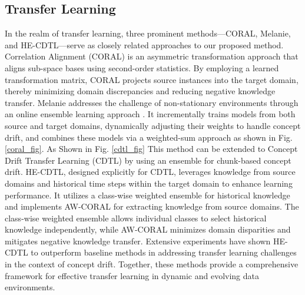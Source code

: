 \subsection{Transfer Learning}
\label{sec:3_6_2_related_work_transfer}

In the realm of transfer learning, three prominent methods—CORAL, Melanie, and HE-CDTL—serve as closely related approaches to our proposed method. Correlation Alignment \cite{sun2016return} (CORAL) is an asymmetric transformation approach that aligns sub-space bases using second-order statistics. By employing a learned transformation matrix, CORAL projects source instances into the target domain, thereby minimizing domain discrepancies and reducing negative knowledge transfer. Melanie addresses the challenge of non-stationary environments through an online ensemble learning approach \cite{dong2019multistream}. It incrementally trains models from both source and target domains, dynamically adjusting their weights to handle concept drift, and combines these models via a weighted-sum approach as shown in Fig. \ref{coral_fig}. As Shown in Fig. \ref{cdtl_fig} This method can be extended to Concept Drift Transfer Learning \cite{sun2016return} (CDTL) by using an ensemble for chunk-based concept drift. HE-CDTL, designed explicitly for CDTL, leverages knowledge from source domains and historical time steps within the target domain to enhance learning performance. It utilizes a class-wise weighted ensemble for historical knowledge and implements AW-CORAL for extracting knowledge from source domains. The class-wise weighted ensemble allows individual classes to select historical knowledge independently, while AW-CORAL minimizes domain disparities and mitigates negative knowledge transfer. Extensive experiments have shown HE-CDTL to outperform baseline methods in addressing transfer learning challenges in the context of concept drift. Together, these methods provide a comprehensive framework for effective transfer learning in dynamic and evolving data environments.

